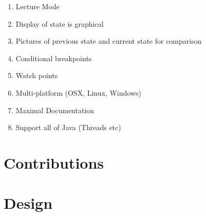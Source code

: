 \documentclass[11pt, a4paper]{article}
\begin{document}
\begin{enumerate}
\item Lecture Mode
\item Display of state is graphical
\item Pictures of previous state and current state for comparison
\item Conditional breakpoints
\item Watch points
\item Multi-platform (OSX, Linux, Windows)
\item Maximal Documentation
\item Support all of Java (Threads etc)
\end{enumerate}


\section{Contributions}
\section{Design}
\end{document}

